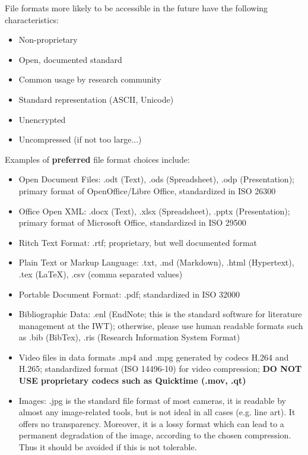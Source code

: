 File formats more likely to be accessible in the future have the following characteristics:
\begin{itemize}
  \item Non-proprietary
  \item Open, documented standard
  \item Common usage by research community
  \item Standard representation (ASCII, Unicode)
  \item Unencrypted
  \item Uncompressed (if not too large...)
\end{itemize}

\noindent Examples of \textbf{preferred} file format choices include:
\begin{itemize}
  \item Open Document Files: .odt (Text), .ods (Spreadsheet),
        .odp (Presentation); primary format of OpenOffice/Libre Office,
        standardized in ISO 26300
  \item Office Open XML: .docx (Text), .xlsx (Spreadsheet),
        .pptx (Presentation); primary format of Microsoft Office,
        standardized in ISO 29500
  \item Ritch Text Format: .rtf; proprietary, but well documented format
  \item Plain Text or Markup Language: .txt, .md (Markdown), .html (Hypertext),
       .tex (LaTeX), .csv (comma separated values)
  \item Portable Document Format: .pdf; standardized in ISO 32000
  \item Bibliographic Data: .enl (EndNote; this is the standard software for
        literature management at the IWT); otherwise, please use human readable
        formats such as .bib (BibTex), .ris (Research Information System Format)
  \item Video files in data formats .mp4 and .mpg generated by codecs H.264 and
        H.265; standardized format (ISO 14496-10) for video compression;
        \textbf{DO NOT USE proprietary \linebreak codecs such as Quicktime (.mov, .qt)}
  \item Images: .jpg is the standard file format of most cameras, it is readable
        by almost any image-related tools, but is not ideal in all cases (e.g.
        line art). It offers no transparency. Moreover, it is a lossy format
        which can lead to a permanent degradation of the image, according to the
        chosen compression. Thus it should be avoided if this is not tolerable.

\end{itemize}
